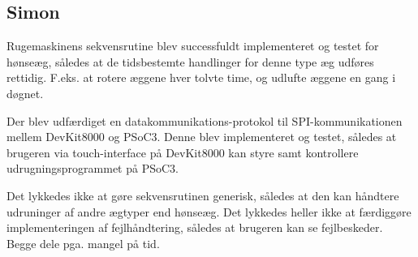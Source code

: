 \subsection{Simon}

Rugemaskinens sekvensrutine blev successfuldt implementeret og testet for hønseæg, således at de tidsbestemte handlinger for denne type æg udføres rettidig. F.eks. at rotere æggene hver tolvte time, og udlufte æggene en gang i døgnet.

Der blev udfærdiget en datakommunikations-protokol til SPI-kommunikationen mellem DevKit8000 og PSoC3. Denne blev implementeret og testet, således at brugeren via touch-interface på DevKit8000 kan styre samt kontrollere udrugningsprogrammet på PSoC3.

Det lykkedes ikke at gøre sekvensrutinen generisk, således at den kan håndtere udruninger af andre ægtyper end hønseæg. Det lykkedes heller ikke at færdiggøre implementeringen af fejlhåndtering, således at brugeren kan se fejlbeskeder. Begge dele pga. mangel på tid.